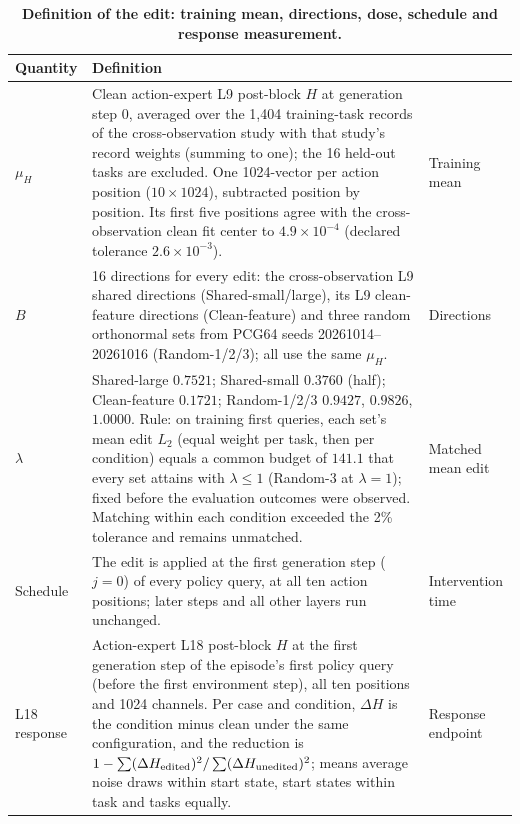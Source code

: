 \begin{table}[t]\centering\small
\caption{\textbf{Definition of the edit: training mean, directions, dose, schedule and response measurement.}}
\label{tab:supp-native-definitions}
\setlength{\tabcolsep}{4pt}
\begin{tabular}{p{}p{}>{\raggedright\arraybackslash\scriptsize}p{}}\toprule
Quantity & Definition & \multicolumn{1}{l}{\small Role}\\\midrule
$\mu_H$ & Clean action-expert L9 post-block $H$ at generation step 0, averaged over the 1,404 training-task records of the cross-observation study with that study's record weights (summing to one); the 16 held-out tasks are excluded. One 1024-vector per action position ($10\times1024$), subtracted position by position. Its first five positions agree with the cross-observation clean fit center to $4.9\times10^{-4}$ (declared tolerance $2.6\times10^{-3}$). & Training mean\\
$B$ & 16 directions for every edit: the cross-observation L9 shared directions (Shared-small/large), its L9 clean-feature directions (Clean-feature) and three random orthonormal sets from PCG64 seeds 20261014--20261016 (Random-1/2/3); all use the same $\mu_H$. & Directions\\
$\lambda$ & Shared-large $0.7521$; Shared-small $0.3760$ (half); Clean-feature $0.1721$; Random-1/2/3 $0.9427$, $0.9826$, $1.0000$. Rule: on training first queries, each set's mean edit $L_2$ (equal weight per task, then per condition) equals a common budget of $141.1$ that every set attains with $\lambda\le1$ (Random-3 at $\lambda=1$); fixed before the evaluation outcomes were observed. Matching within each condition exceeded the 2\% tolerance and remains unmatched. & Matched mean edit\\
Schedule & The edit is applied at the first generation step ($j=0$) of every policy query, at all ten action positions; later steps and all other layers run unchanged. & Intervention time\\
L18 response & Action-expert L18 post-block $H$ at the first generation step of the episode's first policy query (before the first environment step), all ten positions and 1024 channels. Per case and condition, $\Delta H$ is the condition minus clean under the same configuration, and the reduction is $1-\sum(\Delta H_{\rm edited})^2/\sum(\Delta H_{\rm unedited})^2$; means average noise draws within start state, start states within task and tasks equally. & Response endpoint\\\bottomrule
\end{tabular}
\end{table}

